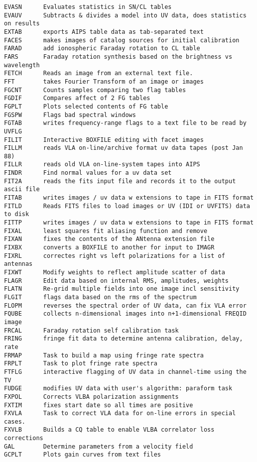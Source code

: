 \begin{verbatim}
EVASN      Evaluates statistics in SN/CL tables
EVAUV      Subtracts & divides a model into UV data, does statistics on results
EXTAB      exports AIPS table data as tab-separated text
FACES      makes images of catalog sources for initial calibration
FARAD      add ionospheric Faraday rotation to CL table
FARS       Faraday rotation synthesis based on the brightness vs wavelength
FETCH      Reads an image from an external text file.
FFT        takes Fourier Transform of an image or images
FGCNT      Counts samples comparing two flag tables
FGDIF      Compares affect of 2 FG tables
FGPLT      Plots selected contents of FG table
FGSPW      Flags bad spectral windows
FGTAB      writes frequency-range flags to a text file to be read by UVFLG
FILIT      Interactive BOXFILE editing with facet images
FILLM      reads VLA on-line/archive format uv data tapes (post Jan 88)
FILLR      reads old VLA on-line-system tapes into AIPS
FINDR      Find normal values for a uv data set
FIT2A      reads the fits input file and records it to the output ascii file
FITAB      writes images / uv data w extensions to tape in FITS format
FITLD      Reads FITS files to load images or UV (IDI or UVFITS) data to disk
FITTP      writes images / uv data w extensions to tape in FITS format
FIXAL      least squares fit aliasing function and remove
FIXAN      fixes the contents of the ANtenna extension file
FIXBX      converts a BOXFILE to another for input to IMAGR
FIXRL      correctes right vs left polarizations for a list of antennas
FIXWT      Modify weights to reflect amplitude scatter of data
FLAGR      Edit data based on internal RMS, amplitudes, weights
FLATN      Re-grid multiple fields into one image incl sensitivity
FLGIT      flags data based on the rms of the spectrum
FLOPM      reverses the spectral order of UV data, can fix VLA error
FQUBE      collects n-dimensional images into n+1-dimensional FREQID image
FRCAL      Faraday rotation self calibration task
FRING      fringe fit data to determine antenna calibration, delay, rate
FRMAP      Task to build a map using fringe rate spectra
FRPLT      Task to plot fringe rate spectra
FTFLG      interactive flagging of UV data in channel-time using the TV
FUDGE      modifies UV data with user's algorithm: paraform task
FXPOL      Corrects VLBA polarization assignments
FXTIM      fixes start date so all times are positive
FXVLA      Task to correct VLA data for on-line errors in special cases.
FXVLB      Builds a CQ table to enable VLBA correlator loss corrections
GAL        Determine parameters from a velocity field
GCPLT      Plots gain curves from text files

\end{verbatim}
